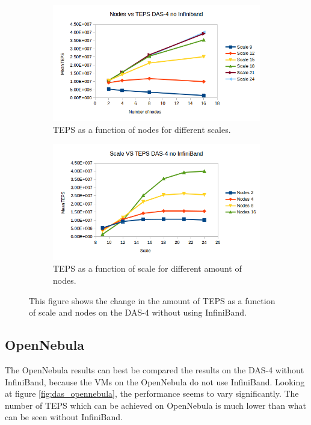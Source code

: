 \begin{figure}[!h]
\centering
\begin{subfigure}{.5\textwidth}
  \centering
  \includegraphics[width=\linewidth]{images/nodes_no_infini.png}
  \caption{TEPS as a function of nodes for different scales.}
  \label{fig:nodes_no_infini}
\end{subfigure}%
\begin{subfigure}{.5\textwidth}
  \centering
  \includegraphics[width=\linewidth]{images/scale_no_infini.png}
  \caption{TEPS as a function of scale for different amount of nodes.}
  \label{fig:scale_no_infini}
\end{subfigure}
\caption{This figure shows the change in the amount of TEPS as a function of scale and nodes on the DAS-4 without using InfiniBand.}
\label{fig:das_no_infini}
\end{figure}

\subsection{OpenNebula}
The OpenNebula results can best be compared the results on the DAS-4 without InfiniBand, because the VMs on the OpenNebula do not use InfiniBand.
Looking at figure \ref{fig:das_opennebula}, the performance seems to vary significantly. The number of TEPS which can be achieved on OpenNebula is much lower than what can be seen without InfiniBand. 

